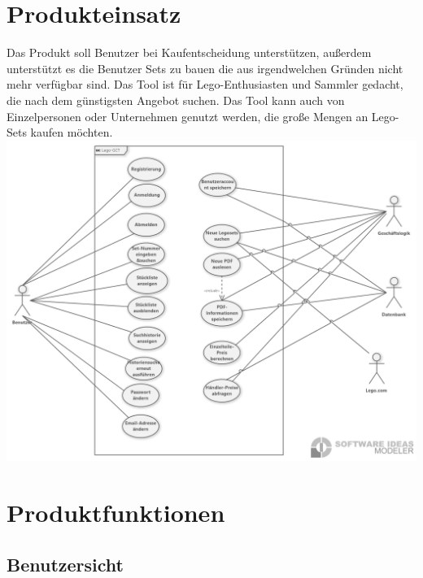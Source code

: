 \section{Produkteinsatz}
 Das Produkt soll Benutzer bei Kaufentscheidung unterstützen, außerdem unterstützt es die Benutzer Sets zu bauen die aus irgendwelchen Gründen nicht mehr verfügbar sind.\newline
Das Tool ist für Lego-Enthusiasten und Sammler gedacht, die nach dem günstigsten Angebot suchen. Das Tool kann auch von Einzelpersonen oder Unternehmen genutzt werden, die große Mengen an Lego-Sets kaufen möchten. \newline
\includegraphics[width=18cm]{pictures/3.UseCase.png} \newpage
\section{Produktfunktionen}

\subsection{Benutzersicht}

